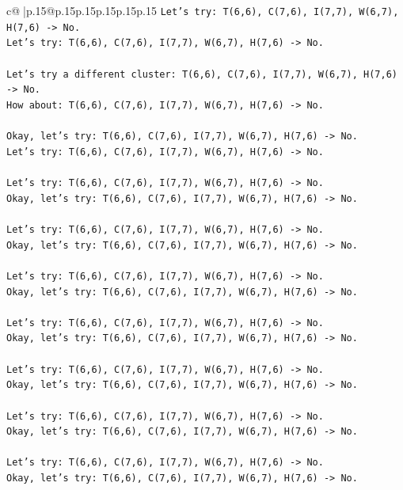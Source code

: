 \documentclass{article}
\begin{document}
{\begin{supertabular}{c@{$\;$}|p{.15\linewidth}@{}p{.15\linewidth}p{.15\linewidth}p{.15\linewidth}p{.15\linewidth}p{.15\linewidth}}
{{{\texttt{Let's try: T(6,6), C(7,6), I(7,7), W(6,7), H(7,6) {-}> No.} \\
\texttt{Let's try: T(6,6), C(7,6), I(7,7), W(6,7), H(7,6) {-}> No.} \\
\\ 
\texttt{Let's try a different cluster: T(6,6), C(7,6), I(7,7), W(6,7), H(7,6) {-}> No.} \\
\texttt{How about: T(6,6), C(7,6), I(7,7), W(6,7), H(7,6) {-}> No.} \\
\\ 
\texttt{Okay, let's try: T(6,6), C(7,6), I(7,7), W(6,7), H(7,6) {-}> No.} \\
\texttt{Let's try: T(6,6), C(7,6), I(7,7), W(6,7), H(7,6) {-}> No.} \\
\\ 
\texttt{Let's try: T(6,6), C(7,6), I(7,7), W(6,7), H(7,6) {-}> No.} \\
\texttt{Okay, let's try: T(6,6), C(7,6), I(7,7), W(6,7), H(7,6) {-}> No.} \\
\\ 
\texttt{Let's try: T(6,6), C(7,6), I(7,7), W(6,7), H(7,6) {-}> No.} \\
\texttt{Okay, let's try: T(6,6), C(7,6), I(7,7), W(6,7), H(7,6) {-}> No.} \\
\\ 
\texttt{Let's try: T(6,6), C(7,6), I(7,7), W(6,7), H(7,6) {-}> No.} \\
\texttt{Okay, let's try: T(6,6), C(7,6), I(7,7), W(6,7), H(7,6) {-}> No.} \\
\\ 
\texttt{Let's try: T(6,6), C(7,6), I(7,7), W(6,7), H(7,6) {-}> No.} \\
\texttt{Okay, let's try: T(6,6), C(7,6), I(7,7), W(6,7), H(7,6) {-}> No.} \\
\\ 
\texttt{Let's try: T(6,6), C(7,6), I(7,7), W(6,7), H(7,6) {-}> No.} \\
\texttt{Okay, let's try: T(6,6), C(7,6), I(7,7), W(6,7), H(7,6) {-}> No.} \\
\\ 
\texttt{Let's try: T(6,6), C(7,6), I(7,7), W(6,7), H(7,6) {-}> No.} \\
\texttt{Okay, let's try: T(6,6), C(7,6), I(7,7), W(6,7), H(7,6) {-}> No.} \\
\\ 
\texttt{Let's try: T(6,6), C(7,6), I(7,7), W(6,7), H(7,6) {-}> No.} \\
\texttt{Okay, let's try: T(6,6), C(7,6), I(7,7), W(6,7), H(7,6) {-}> No.} \\
}}}
\end{supertabular}}
\end{document}

